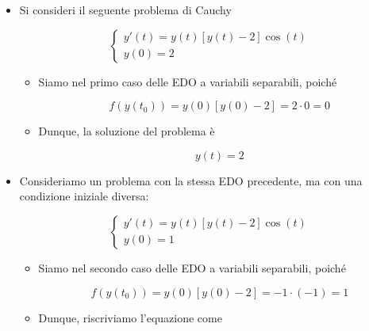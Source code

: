\documentclass[a4paper, 12pt]{report}
\begin{document}
\begin{itemize}
\begin{itemize}
            \[ y_1(0)=-1 + \sqrt{1+0} = -1 + 1 = 0 \quad \Longrightarrow \text{Soddisfa la condizione}\]
            \[ y_2(0)=-1 - \sqrt{1+0} = -1 - 1 = -2 \quad \Longrightarrow \text{Non soddisfa a condizione}\]
            
            \item Dunque, la soluzione del problema è:
            
            \[ y(t) = -1 + \sqrt{1+s^2}\]
        \end{itemize}
        
        \quad
        
        \item Si consideri il seguente problema di Cauchy
        
        $$
        \left \{ \begin{array}{l}
            y'(t) = y(t)[y(t)-2]\cos(t) \\
            y(0) = 2
        \end{array}\right .
        $$
        
        \begin{itemize}
            \item Siamo nel primo caso delle EDO a variabili separabili, poiché
            
            \[ f(y(t_0)) =  y(0)[y(0)-2] = 2 \cdot 0 = 0\]
            
            \item Dunque, la soluzione del problema è
            
            \[ y(t) = 2\]
        \end{itemize}
        
        \item Consideriamo un problema con la stessa EDO precedente, ma con una condizione iniziale diversa:
        
        $$
        \left \{ \begin{array}{l}
            y'(t) = y(t)[y(t)-2]\cos(t) \\
            y(0) = 1
        \end{array}\right .
        $$
        
        \begin{itemize}
            \item Siamo nel secondo caso delle EDO a variabili separabili, poiché
            
            \[ f(y(t_0)) =  y(0)[y(0)-2] = -1 \cdot (-1) = 1\]
            
            \item Dunque, riscriviamo l'equazione come
            

\end{itemize}
\end{itemize}
\end{document}
